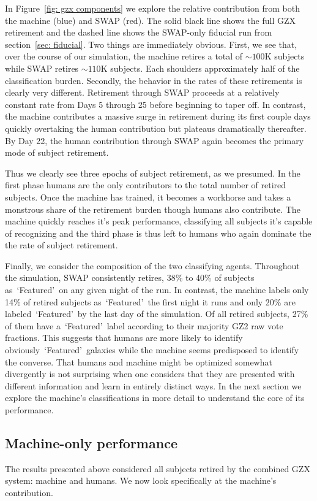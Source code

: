 \documentclass[twocolumn]{aastex6}
\newcommand{\feat}{`Featured'}
\begin{document}
In Figure~\ref{fig: gzx components} we explore the relative contribution from both the 
machine (blue) and SWAP (red). The solid black line shows the full GZX retirement 
and the dashed line shows the SWAP-only fiducial run from section~\ref{sec: fiducial}. 
Two things are immediately obvious. 
First, we see that, over the course of our simulation, the machine retires a total of 
$\sim100$K subjects while SWAP retires $\sim110$K subjects. Each shoulders approximately
half of the classification burden. Secondly, the behavior in the rates of these
retirements is clearly very different. Retirement through SWAP proceeds at a relatively
constant rate from Days 5 through 25 before beginning to taper off. In contrast, 
the machine contributes a massive surge in retirement during its first couple days 
quickly overtaking the human contribution but plateaus dramatically thereafter.
By Day 22, the human contribution through SWAP  again becomes the primary mode 
of subject retirement. 

Thus we clearly see  three epochs of subject retirement, as we presumed.
In the first phase humans are the only contributors to the total number of retired subjects.  
Once the machine has trained, it becomes a workhorse and takes a monstrous share 
of the retirement burden though humans also contribute. 
The machine quickly reaches it's peak performance, classifying all subjects 
it's capable of recognizing and the third phase is thus left to humans who again dominate 
the the rate of subject retirement. 

Finally, we consider the composition of the two classifying agents. 
Throughout the simulation, SWAP consistently retires, 38\% to 40\% of subjects
 as~\feat~on any given night of the run. 
In contrast, the machine labels only 14\% of retired subjects as~\feat~the first 
night it runs and only 20\% are labeled~\feat~by the last day of the simulation. 
Of all retired subjects, 27\% of them have a~\feat~label according to their majority
 GZ2 raw vote fractions. This suggests that humans are more likely to identify
obviously~\feat~galaxies while the machine seems predisposed to identify the converse.
That humans and machine might be optimized  somewhat divergently is not surprising when 
one considers that they are presented with different information and learn in 
entirely distinct ways.  In the next section we explore  the machine's classifications 
in more detail to understand the core of its performance.


\subsection{Machine-only performance}
The results presented above considered all subjects retired by the combined GZX system:
machine and humans. We now look specifically at the machine's contribution. 
\end{document}
